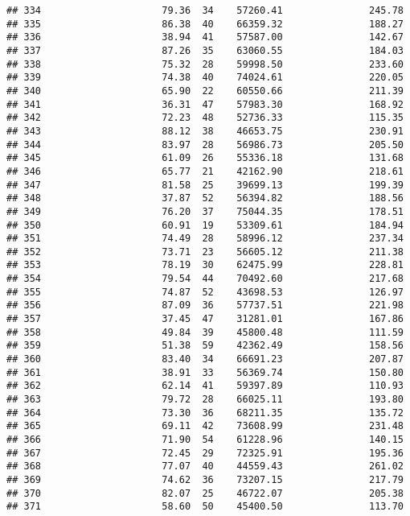 \documentclass[
]{article}
\begin{document}
\begin{verbatim}
## 334                     79.36  34    57260.41               245.78
## 335                     86.38  40    66359.32               188.27
## 336                     38.94  41    57587.00               142.67
## 337                     87.26  35    63060.55               184.03
## 338                     75.32  28    59998.50               233.60
## 339                     74.38  40    74024.61               220.05
## 340                     65.90  22    60550.66               211.39
## 341                     36.31  47    57983.30               168.92
## 342                     72.23  48    52736.33               115.35
## 343                     88.12  38    46653.75               230.91
## 344                     83.97  28    56986.73               205.50
## 345                     61.09  26    55336.18               131.68
## 346                     65.77  21    42162.90               218.61
## 347                     81.58  25    39699.13               199.39
## 348                     37.87  52    56394.82               188.56
## 349                     76.20  37    75044.35               178.51
## 350                     60.91  19    53309.61               184.94
## 351                     74.49  28    58996.12               237.34
## 352                     73.71  23    56605.12               211.38
## 353                     78.19  30    62475.99               228.81
## 354                     79.54  44    70492.60               217.68
## 355                     74.87  52    43698.53               126.97
## 356                     87.09  36    57737.51               221.98
## 357                     37.45  47    31281.01               167.86
## 358                     49.84  39    45800.48               111.59
## 359                     51.38  59    42362.49               158.56
## 360                     83.40  34    66691.23               207.87
## 361                     38.91  33    56369.74               150.80
## 362                     62.14  41    59397.89               110.93
## 363                     79.72  28    66025.11               193.80
## 364                     73.30  36    68211.35               135.72
## 365                     69.11  42    73608.99               231.48
## 366                     71.90  54    61228.96               140.15
## 367                     72.45  29    72325.91               195.36
## 368                     77.07  40    44559.43               261.02
## 369                     74.62  36    73207.15               217.79
## 370                     82.07  25    46722.07               205.38
## 371                     58.60  50    45400.50               113.70

\end{verbatim}
\end{document}
